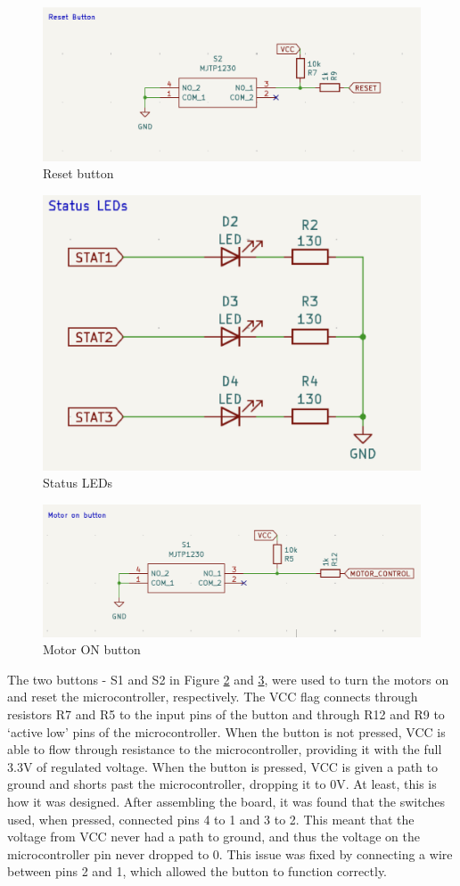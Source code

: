 \documentclass{article}
\begin{document}
\begin{figure}[H]
    \centering
    \includegraphics[width=0.5\linewidth]{REPORT/Reset.png}
    \caption{Reset button}
    \label{fig:RSET}
\end{figure}

\begin{figure}[H]
    \centering
    \includegraphics[width=0.35\linewidth]{REPORT/LED.png}
    \caption{Status LEDs}
    \label{fig:led}
\end{figure}

\begin{figure}[H]
    \centering
    \includegraphics[width=0.6\linewidth]{REPORT/MotorON.png}
    \caption{Motor ON button}
    \label{fig:Motor ON}
\end{figure}

The two buttons - S1 and S2 in Figure \ref{fig:led} and \ref{fig:Motor ON}, were used to turn the motors on and reset the microcontroller, respectively. The VCC flag connects through resistors R7 and R5 to the input pins of the button and through R12 and R9 to ‘active low’ pins of the microcontroller. When the button is not pressed, VCC is able to flow through resistance to the microcontroller, providing it with the full 3.3V of regulated voltage. When the button is pressed, VCC is given a path to ground and shorts past the microcontroller, dropping it to 0V. At least, this is how it was designed. After assembling the board, it was found that the switches used, when pressed, connected pins 4 to 1 and 3 to 2. This meant that the voltage from VCC never had a path to ground, and thus the voltage on the microcontroller pin never dropped to 0. This issue was fixed by connecting a wire between pins 2 and 1, which allowed the button to function correctly. 
\\
\end{document}
